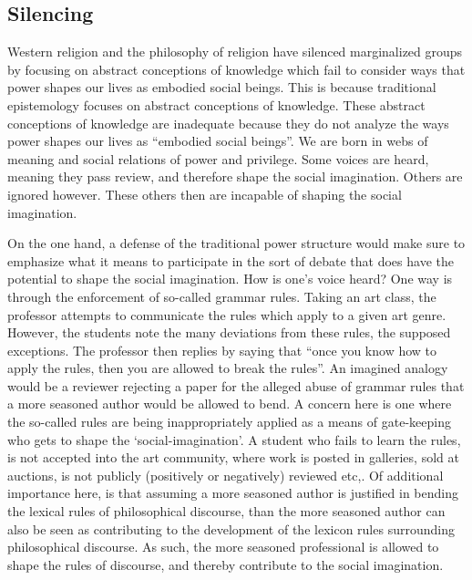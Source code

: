 \documentclass[
  letterpaper,
  DIV=11,
  numbers=noendperiod]{scrreprt}
\begin{document}
\begin{tcolorbox}[enhanced jigsaw, arc=.35mm, breakable, rightrule=.15mm, colback=white, colframe=quarto-callout-important-color-frame, bottomrule=.15mm, leftrule=.75mm, opacityback=0, toprule=.15mm, left=2mm]
\begin{tcolorbox}[enhanced jigsaw, arc=.35mm, breakable, rightrule=.15mm, colback=white, colframe=quarto-callout-tip-color-frame, bottomrule=.15mm, leftrule=.75mm, opacityback=0, toprule=.15mm, left=2mm]
\section{Silencing}\label{silencing}

Western religion and the philosophy of religion have silenced
marginalized groups by focusing on abstract conceptions of knowledge
which fail to consider ways that power shapes our lives as embodied
social beings. This is because traditional epistemology focuses on
abstract conceptions of knowledge. These abstract conceptions of
knowledge are inadequate because they do not analyze the ways power
shapes our lives as ``embodied social beings''. We are born in webs of
meaning and social relations of power and privilege. Some voices are
heard, meaning they pass review, and therefore shape the social
imagination. Others are ignored however. These others then are incapable
of shaping the social imagination.

On the one hand, a defense of the traditional power structure would make
sure to emphasize what it means to participate in the sort of debate
that does have the potential to shape the social imagination. How is
one's voice heard? One way is through the enforcement of so-called
grammar rules. Taking an art class, the professor attempts to
communicate the rules which apply to a given art genre. However, the
students note the many deviations from these rules, the supposed
exceptions. The professor then replies by saying that ``once you know
how to apply the rules, then you are allowed to break the rules''. An
imagined analogy would be a reviewer rejecting a paper for the alleged
abuse of grammar rules that a more seasoned author would be allowed to
bend. A concern here is one where the so-called rules are being
inappropriately applied as a means of gate-keeping who gets to shape the
`social-imagination'. A student who fails to learn the rules, is not
accepted into the art community, where work is posted in galleries, sold
at auctions, is not publicly (positively or negatively) reviewed etc,.
Of additional importance here, is that assuming a more seasoned author
is justified in bending the lexical rules of philosophical discourse,
than the more seasoned author can also be seen as contributing to the
development of the lexicon rules surrounding philosophical discourse. As
such, the more seasoned professional is allowed to shape the rules of
discourse, and thereby contribute to the social imagination.


\end{tcolorbox}
\end{tcolorbox}
\end{document}
